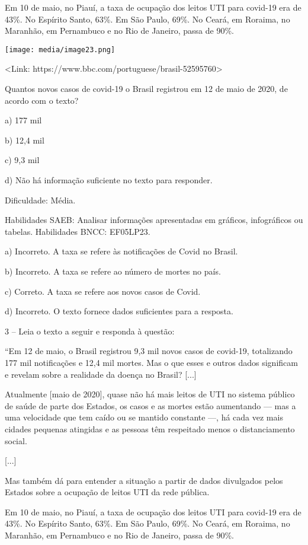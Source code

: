 Em 10 de maio, no Piauí, a taxa de ocupação dos leitos UTI para covid-19
era de 43\%. No Espírito Santo, 63\%. Em São Paulo, 69\%. No Ceará, em
Roraima, no Maranhão, em Pernambuco e no Rio de Janeiro, passa de 90\%.

\texttt{[image: media/image23.png]}

\textless{}Link:
https://www.bbc.com/portuguese/brasil-52595760\textgreater{}

Quantos novos casos de covid-19 o Brasil registrou em 12 de maio de
2020, de acordo com o texto?

a) 177 mil

b) 12,4 mil

c) 9,3 mil

d) Não há informação suficiente no texto para responder.

Dificuldade: Média.

Habilidades SAEB: Analisar informações apresentadas em gráficos,
infográficos ou tabelas. Habilidades BNCC: EF05LP23.

a) Incorreto. A taxa se refere às notificações de Covid no Brasil.

b) Incorreto. A taxa se refere ao número de mortes no país.

c) Correto. A taxa se refere aos novos casos de Covid.

d) Incorreto. O texto fornece dados suficientes para a resposta.

3 -- Leia o texto a seguir e responda à questão:

``Em 12 de maio, o Brasil registrou 9,3 mil novos casos de covid-19,
totalizando 177 mil notificações e 12,4 mil mortes. Mas o que esses e
outros dados significam e revelam sobre a realidade da doença no Brasil?
{[}...{]}

Atualmente {[}maio de 2020{]}, quase não há mais leitos de UTI no
sistema público de saúde de parte dos Estados, os casos e as mortes
estão aumentando --- mas a uma velocidade que tem caído ou se mantido
constante ---, há cada vez mais cidades pequenas atingidas e as pessoas
têm respeitado menos o distanciamento social.

{[}...{]}

Mas também dá para entender a situação a partir de dados divulgados
pelos Estados sobre a ocupação de leitos UTI da rede pública.

Em 10 de maio, no Piauí, a taxa de ocupação dos leitos UTI para covid-19
era de 43\%. No Espírito Santo, 63\%. Em São Paulo, 69\%. No Ceará, em
Roraima, no Maranhão, em Pernambuco e no Rio de Janeiro, passa de 90\%.

